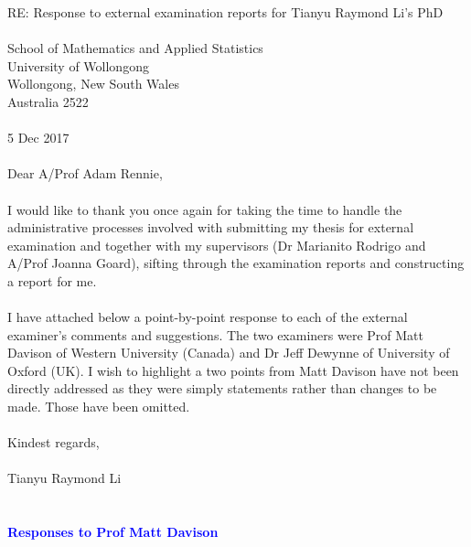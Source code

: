 \documentclass{article}
\begin{document}
RE: Response to external examination reports for Tianyu Raymond Li's PhD
\\
\\
School of Mathematics and Applied Statistics \\
University of Wollongong \\
Wollongong, New South Wales \\
Australia 2522
\\
\\
5 Dec 2017
\\
\\
Dear A/Prof Adam Rennie,
\\
\\
I would like to thank you once again for taking the time to handle the administrative processes involved with submitting my thesis for external examination and together with my supervisors (Dr Marianito Rodrigo and A/Prof Joanna Goard), sifting through the examination reports and constructing a report for me. 
\\
\\
I have attached below a point-by-point response to each of the external examiner's comments and suggestions. The two examiners were Prof Matt Davison of Western University (Canada) and Dr Jeff Dewynne of University of Oxford (UK). I wish to highlight a two points from Matt Davison have not been directly addressed as they were simply statements rather than changes to be made. Those have been omitted.
\\
\\
Kindest regards,
\\
\\
Tianyu Raymond Li
\\
\\
\\
\textcolor{blue}{\textbf{Responses to Prof Matt Davison\\ \\}}
\end{document}
